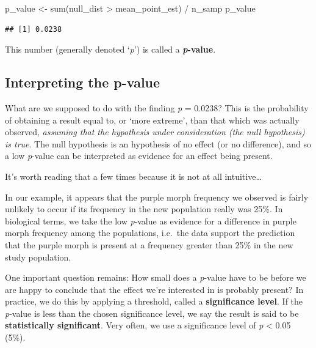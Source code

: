 \documentclass[
]{book}
\newenvironment{Shaded}{\begin{snugshade}}{\end{snugshade}}
\newcommand{\FunctionTok}[1]{\textcolor[rgb]{0.00,0.00,0.00}{#1}}
\newcommand{\NormalTok}[1]{#1}
\newcommand{\OtherTok}[1]{\textcolor[rgb]{0.56,0.35,0.01}{#1}}
\newcommand{\SpecialCharTok}[1]{\textcolor[rgb]{0.00,0.00,0.00}{#1}}
\begin{document}
\begin{Shaded}
\begin{Highlighting}[]
\NormalTok{p\_value }\OtherTok{\textless{}{-}} \FunctionTok{sum}\NormalTok{(null\_dist }\SpecialCharTok{\textgreater{}}\NormalTok{ mean\_point\_est) }\SpecialCharTok{/}\NormalTok{ n\_samp}
\NormalTok{p\_value}
\end{Highlighting}
\end{Shaded}

\begin{verbatim}
## [1] 0.0238
\end{verbatim}

This number (generally denoted `\emph{p}') is called a \textbf{\emph{p}-value}.

\hypertarget{interpreting-the-p-value}{%
\subsection*{Interpreting the p-value}\label{interpreting-the-p-value}}

What are we supposed to do with the finding \emph{p} = 0.0238? This is the probability of obtaining a result equal to, or `more extreme', than that which was actually observed, \emph{assuming that the hypothesis under consideration (the null hypothesis) is true}. The null hypothesis is an hypothesis of no effect (or no difference), and so a low \emph{p}-value can be interpreted as evidence for an effect being present.

It's worth reading that a few times because it is not at all intuitive\ldots{}

In our example, it appears that the purple morph frequency we observed is fairly unlikely to occur if its frequency in the new population really was 25\%. In biological terms, we take the low \emph{p}-value as evidence for a difference in purple morph frequency among the populations, i.e.~the data support the prediction that the purple morph is present at a frequency greater than 25\% in the new study population.

One important question remains: How small does a \emph{p}-value have to be before we are happy to conclude that the effect we're interested in is probably present? In practice, we do this by applying a threshold, called a \textbf{significance level}. If the \emph{p}-value is less than the chosen significance level, we say the result is said to be \textbf{statistically significant}. Very often, we use a significance level of \emph{p} \textless{} 0.05 (5\%).
\end{document}
